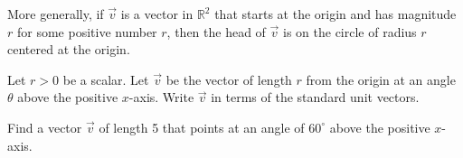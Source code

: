 More generally, if $\vec{v}$ is a vector in $\mathbb{R}^2$ that starts at the origin and has magnitude $r$ for some positive number $r$, then the head of $\vec{v}$ is on the circle of radius $r$ centered at the origin.

\begin{ex}
    Let $r>0$ be a scalar. Let $\vec{v}$ be the vector of length $r$ from the origin at an angle $\theta$ above the positive $x$-axis. Write $\vec{v}$ in terms of the standard unit vectors.
\end{ex}

\vspace{3in}

\begin{ex}
    Find a vector $\vec{v}$ of length 5 that points at an angle of $60^\circ$ above the positive $x$-axis.
\end{ex}

\vfill
